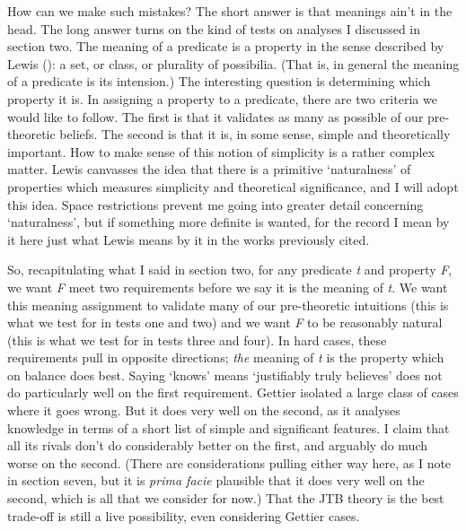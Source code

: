\documentclass[
  11pt,
  letterpaper,
  DIV=11,
  numbers=noendperiod,
  oneside]{scrartcl}
\begin{document}
How can we make such mistakes? The short answer is that meanings ain't
in the head. The long answer turns on the kind of tests on analyses I
discussed in section two. The meaning of a predicate is a property in
the sense described by Lewis
(): a set, or class, or plurality of
possibilia. (That is, in general the meaning of a predicate is its
intension.) The interesting question is
determining which property it is. In assigning a property to a
predicate, there are two criteria we would like to follow. The first is
that it validates as many as possible of our pre-theoretic beliefs. The
second is that it is, in some sense, simple and theoretically important.
How to make sense of this notion of simplicity is a rather complex
matter. Lewis canvasses the idea that there is a primitive `naturalness'
of properties which measures simplicity and theoretical
significance, and I will adopt this
idea. Space restrictions prevent me going into greater detail concerning
`naturalness', but if something more definite is wanted, for the record
I mean by it here just what Lewis means by it in the works previously
cited.

So, recapitulating what I said in section two, for any predicate
\emph{t} and property \emph{F}, we want \emph{F} meet two requirements
before we say it is the meaning of \emph{t}. We want this meaning
assignment to validate many of our pre-theoretic intuitions (this is
what we test for in tests one and two) and we want \emph{F} to be
reasonably natural (this is what we test for in tests three and four).
In hard cases, these requirements pull in opposite directions;
\emph{the} meaning of \emph{t} is the property which on balance does
best. Saying `knows' means `justifiably truly believes' does not do
particularly well on the first requirement. Gettier isolated a large
class of cases where it goes wrong. But it does very well on the second,
as it analyses knowledge in terms of a short list of simple and
significant features. I claim that all its rivals don't do considerably
better on the first, and arguably do much worse on the second. (There
are considerations pulling either way here, as I note in section seven,
but it is \emph{prima facie} plausible that it does very well on the
second, which is all that we consider for now.) That the JTB theory is
the best trade-off is still a live possibility, even considering Gettier
cases.
\end{document}

